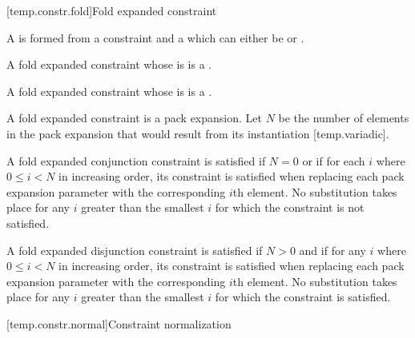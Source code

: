 \documentclass{wg21}
\begin{document}
\begin{addedblock}
[temp.constr.fold]{Fold expanded constraint}

A  is formed from a constraint and a  which can either be \tcode{\&\&} or \tcode{||}.

A fold expanded constraint whose  is \tcode{\&\&} is a .

A fold expanded constraint whose  is \tcode{||} is a .

A fold expanded constraint is a pack expansion. Let $N$ be the number of elements in the pack expansion that would result from its instantiation [temp.variadic].

A fold expanded conjunction constraint is satisfied if $N = 0$ or if for each $i$ where $0 \le i < N$ in increasing order, its constraint is satisfied when replacing each pack expansion parameter with the corresponding $i$th element. No substitution takes place for any $i$ greater than the smallest $i$ for which the constraint is not satisfied.


A fold expanded disjunction constraint is satisfied if $N > 0$ and if for any $i$ where  $0 \le i < N$ in increasing order, its constraint is satisfied when replacing each pack expansion parameter with the corresponding $i$th element. No substitution takes place for any $i$ greater than the smallest $i$ for which the constraint is satisfied.


\end{addedblock}




\ednote{[...]}


[temp.constr.normal]{Constraint normalization}
%
\end{document}
